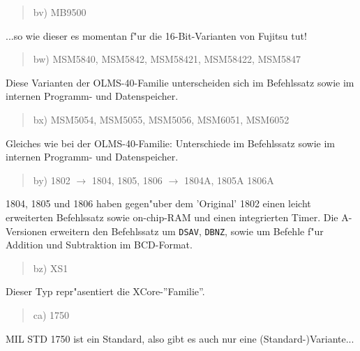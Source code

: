 \documentclass[12pt,a4paper,twoside]{report}
\newcommand{\tty}[1]{{\tt #1}}
\begin{document}
{%
\begin{quote}
bv) MB9500
\end{quote}
...so wie dieser es momentan f"ur die 16-Bit-Varianten von Fujitsu tut!
\begin{quote}
bw) MSM5840, MSM5842, MSM58421, MSM58422, MSM5847
\end{quote}
Diese Varianten der OLMS-40-Familie unterscheiden sich im
Befehlssatz sowie im internen Programm- und Datenspeicher.
\begin{quote}
bx) MSM5054, MSM5055, MSM5056, MSM6051, MSM6052
\end{quote}
Gleiches wie bei der OLMS-40-Familie: Unterschiede im
Befehlssatz sowie im internen Programm- und Datenspeicher.
\begin{quote}
by) 1802 $\rightarrow$ 1804, 1805, 1806 $\rightarrow$ 1804A, 1805A
1806A
\end{quote}
1804, 1805 und 1806 haben gegen"uber dem 'Original' 1802 einen leicht
erweiterten Befehlssatz sowie on-chip-RAM und einen integrierten
Timer.  Die A-Versionen erweitern den Befehlssatz um \tty{DSAV}, 
\tty{DBNZ}, sowie um Befehle f"ur Addition und Subtraktion im
BCD-Format.
\begin{quote}
bz) XS1
\end{quote}
Dieser Typ repr"asentiert die XCore-''Familie''.
\begin{quote}
ca) 1750
\end{quote}
MIL STD 1750 ist ein Standard, also gibt es auch nur eine
(Standard-)Variante...

}
\end{document}

